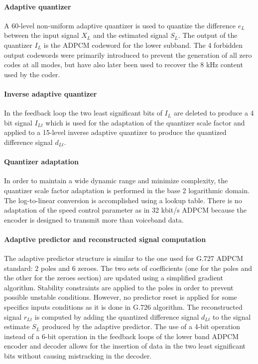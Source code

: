 \paragraph{Adaptive quantizer}

A 60-level non-uniform adaptive quantizer is used to quantize the
difference $e_L$ between the input signal $X_{L}$ and the estimated
signal $S_{L}$. The output of the quantizer $I_{L}$ is the ADPCM
codeword for the lower subband. The 4 forbidden output codewords were
primarily introduced to prevent the generation of all zero codes at
all modes, but have also later been used to recover the 8 kHz content
used by the coder.


\paragraph{Inverse adaptive quantizer}

In the feedback loop the two least significant bits of $I_{L}$ are deleted to produce a 4 bit signal $I_{Lt}$ which is used for the adaptation of the quantizer scale factor and applied to a 15-level inverse adaptive quantizer to produce the quantized difference signal $d_{Lt}$.


\paragraph{Quantizer adaptation}

In order to maintain a wide dynamic range and minimize complexity, the
quantizer scale factor adaptation is performed in the base 2
logarithmic domain. The log-to-linear conversion is accomplished using
a lookup table. There is no adaptation of the speed control parameter
as in 32 kbit/s ADPCM \cite{G.726} because the encoder is designed to
transmit more than voiceband data.


\paragraph{Adaptive predictor and reconstructed signal computation}

The adaptive predictor structure is similar to the one used for G.727
ADPCM standard: 2 poles and 6 zeroes. The two sets of coefficients
(one for the poles and  the other for the zeroes section) are updated
using a simplified gradient algorithm. Stability constraints are
applied to the poles in order to prevent possible unstable
conditions. However, no predictor reset is applied for some specifics
inputs conditions as it is done in G.726 algorithm. The
reconstructed signal $r_{Lt}$ is computed by adding the quantized
difference signal $d_{Lt}$ to the signal estimate $S_{L}$ produced by the
adaptive predictor. The use of a 4-bit operation instead of a 6-bit
operation in the feedback loops of the lower band ADPCM encoder and
decoder allows for the insertion of data in the two least
significant bits without causing mistracking in the decoder.


